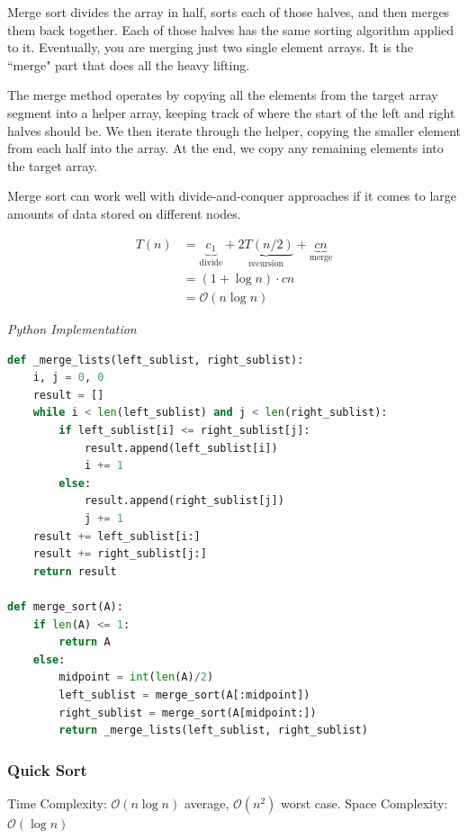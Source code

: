 \documentclass{article}
\newcommand{\bigO}{\mathcal{O}}
\begin{document}
    Merge sort divides the array in half, sorts each of those halves, and then merges them back together. Each of those halves has the same sorting algorithm applied to it. Eventually, you are merging just two single element arrays. It is the ``merge" part that does all the heavy lifting.
    
    The merge method operates by copying all the elements from the target array segment into a helper array, keeping track of where the start of the left and right halves should be. We then iterate through the helper, copying the smaller element from each half into the array. At the end, we copy any remaining elements into the target array.
    
    Merge sort can work well with divide-and-conquer approaches if it comes to large amounts of data stored on different nodes. 
    
    \begin{align*}
        T(n) &= 
            \underbrace{c_1}_\text{divide}
            + \underbrace{2T(n/2)}_\text{recursion}
            + \underbrace{c  n}_\text{merge}\\
        &= (1 + \log n) \cdot cn\\
        &= \bigO(n \log n)
    \end{align*}
    

\vspace{8pt} \emph{Python Implementation}
\begin{lstlisting}[language=Python]
def _merge_lists(left_sublist, right_sublist):
    i, j = 0, 0
    result = []
    while i < len(left_sublist) and j < len(right_sublist):
        if left_sublist[i] <= right_sublist[j]:
            result.append(left_sublist[i])
            i += 1
        else:
            result.append(right_sublist[j])
            j += 1
    result += left_sublist[i:]
    result += right_sublist[j:]
    return result

def merge_sort(A):
    if len(A) <= 1:
        return A
    else:
        midpoint = int(len(A)/2)
        left_sublist = merge_sort(A[:midpoint])
        right_sublist = merge_sort(A[midpoint:])
        return _merge_lists(left_sublist, right_sublist)
\end{lstlisting}
    
    \subsubsection{Quick Sort}
     Time Complexity: $\bigO (n \log n)$ average, $\bigO (n^2)$ worst case. Space Complexity: $\bigO (\log n )$
     
\end{document}
